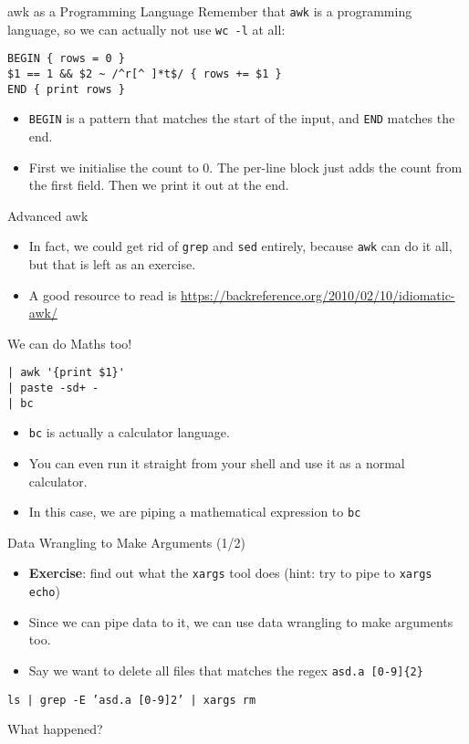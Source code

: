 \documentclass[12pt]{beamer}
\begin{document}
\begin{frame}[fragile]{awk as a Programming Language}
  Remember that \texttt{awk} is a programming language, so we can actually not use \texttt{wc -l} at all:
  \begin{verbatim}
BEGIN { rows = 0 }
$1 == 1 && $2 ~ /^r[^ ]*t$/ { rows += $1 }
END { print rows }
  \end{verbatim}
  \begin{itemize}
    \item \texttt{BEGIN} is a pattern that matches the start of the input, and \texttt{END} matches the end.
    \item First we initialise the count to 0. The per-line block just adds the count from the first field. Then we print it out at the end.
  \end{itemize}
\end{frame}

\begin{frame}{Advanced awk}
  \begin{itemize}
    \item In fact, we could get rid of \texttt{grep} and \texttt{sed} entirely, because \texttt{awk} can do it all, but that is left as an exercise.
    \item A good resource to read is \url{https://backreference.org/2010/02/10/idiomatic-awk/}
  \end{itemize}
\end{frame}

\begin{frame}[fragile]{We can do Maths too!}
  \begin{verbatim}
| awk '{print $1}'
| paste -sd+ -
| bc
  \end{verbatim}
  \begin{itemize}
    \item \texttt{bc} is actually a calculator language.
    \item You can even run it straight from your shell and use it as a normal calculator.
    \item In this case, we are piping a mathematical expression to \texttt{bc}
  \end{itemize}
\end{frame}

\begin{frame}{Data Wrangling to Make Arguments (1/2)}
  \begin{itemize}
    \item \textbf{Exercise}: find out what the \texttt{xargs} tool does (hint: try to pipe to \texttt{xargs echo})\pause
    \item Since we can pipe data to it, we can use data wrangling to make arguments too.
    \item Say we want to delete all files that matches the regex \texttt{asd.a [0-9]\{2\}}
  \end{itemize}
  \texttt{ls | grep -E 'asd.a [0-9]{2}' | xargs rm}

  What happened?
\end{frame}
\end{document}
